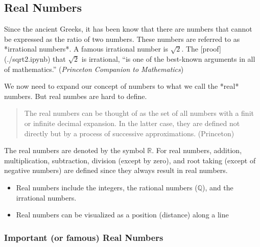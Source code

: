 \subsection{Real Numbers}

Since the ancient Greeks, it has been know that there are numbers that cannot be expressed as the ratio of two numbers. These numbers are referred to as *irrational numbers*. A famous irrational number is $\sqrt{2}$. The [proof](./sqrt2.ipynb) that $\sqrt{2}$ is irrational, ``is one of the best-known arguments in all of mathematics.'' (\emph{Princeton Companion to Mathematics})


We now need to expand our concept of numbers to what we call the *real* numbers. But real numbes are hard to define.

\begin{quote}
    The real numbers can be thought of as the set of all numbers with a finit or infinite decimal expansion. In the latter case, they are defined not directly but by a process of successive approximations. (Princeton)
\end{quote}

The real numbers are denoted by the symbol $\mathbb{R}$. For real numbers, addition, multiplication, subtraction, division (except by zero), and root taking (except of negative numbers) are defined since they always result in real numbers.

\begin{itemize}
    \item Real numbers include the integers, the rational numbers ($\mathbb{Q}$), and the irrational numbers.
    \item Real numbers can be visualized as a position (distance) along a line
\end{itemize}



\subsubsection{Important (or famous) Real Numbers}

